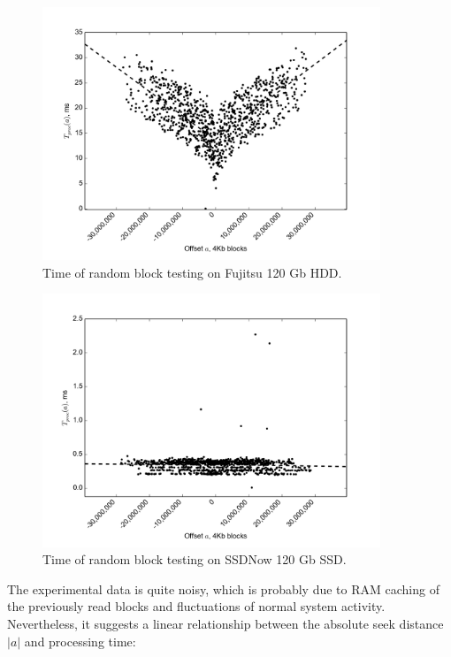 \documentclass[final,5p,times,twocolumn,authoryear]{elsarticle}
\begin{document}
\begin{figure}
  \centerline{\includegraphics[width=0.9\textwidth]{seek-time-hdd}}
  \caption{Time of random block testing on Fujitsu 120 Gb HDD.}
  \label{fig:seek_time_hdd}
\end{figure}

\begin{figure}
  \centerline{\includegraphics[width=0.9\textwidth]{seek-time-ssd}}
  \caption{Time of random block testing on SSDNow 120 Gb SSD.}
  \label{fig:seek_time_ssd}
\end{figure}

The experimental data is quite noisy, which is probably due to RAM caching of the previously read blocks and fluctuations of normal system activity. Nevertheless, it suggests a linear relationship between the absolute seek distance $|a|$ and processing time:
\end{document}
